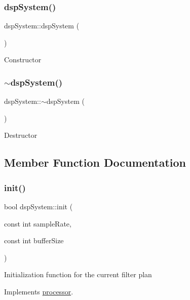 \subsubsection{\texorpdfstring{dsp\+System()}{dspSystem()}}
{\footnotesize\ttfamily dsp\+System\+::dsp\+System (\begin{DoxyParamCaption}{ }\end{DoxyParamCaption})}

Constructor \mbox{\label{classdspSystem_a8e60ef1e72e63a5362141a9e6c3efcfe}} 
\subsubsection{\texorpdfstring{$\sim$dsp\+System()}{~dspSystem()}}
{\footnotesize\ttfamily dsp\+System\+::$\sim$dsp\+System (\begin{DoxyParamCaption}{ }\end{DoxyParamCaption})}

Destructor 

\subsection{Member Function Documentation}
\mbox{\label{classdspSystem_a57676105878d826fe28c9faf9bd83c3e}} 
\subsubsection{\texorpdfstring{init()}{init()}}
{\footnotesize\ttfamily bool dsp\+System\+::init (\begin{DoxyParamCaption}\item[{const int}]{sample\+Rate,  }\item[{const int}]{buffer\+Size }\end{DoxyParamCaption})\hspace{0.3cm}{\ttfamily [virtual]}}

Initialization function for the current filter plan 

Implements \hyperlink{classprocessor_ab320bfde3ea30e74e9055a7643113922}{processor}.

\mbox{\label{classdspSystem_addff0f24f52320d613d7303b2a15562f}} 
